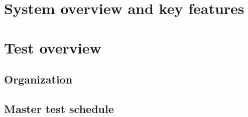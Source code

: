 \section{System overview and key features} \label{s:introduction:system-overview-and-key-features}
	\begin{comment}
		$<$Describe the mission or business purpose of the system or software product under test (or reference where the information can be found, e.g., in a system definition document, such as a Concept of
		Operations). Describe the key features of the system or software under test [or reference where the information can be found, e.g., in a requirements document or COTS documentation]. $>$
	\end{comment}

\section{Test overview} \label{s:introduction:test-overview}
	\begin{comment}
		$<$Describe the test organization, test schedule, integrity level scheme, test resources, responsibilities, tools, techniques, and methods necessary to perform the testing. $>$
	\end{comment}

\subsection{Organization} \label{s:introduction:organization}
	\begin{comment}
		$<$Describe the relationship of the test processes to other processes such as development, project
		management, quality assurance, and configuration management. Include the lines of communication
		within the testing organization(s), the authority for resolving issues raised by the testing tasks, and the authority for approving test products and processes. This may include (but should not be limited to) a visual representation, e.g., an organization chart. $>$
	\end{comment}

\subsection{Master test schedule} \label{s:introduction:master-test-schedule}
	\begin{comment}
		$<$Describe the test activities within the project life cycle and milestones. Summarize the overall schedule of the testing tasks, identifying where task results feed back to the development, organizational, and supporting processes (e.g., quality assurance and configuration management). Describe the task iteration policy for the re-execution of test tasks and any dependencies. $>$
	\end{comment}

